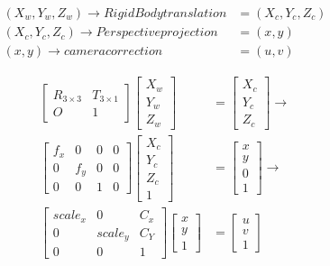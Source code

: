 \documentclass{article}
\begin{document}
\begin{align*}
    (X_w,Y_w,Z_w)\rightarrow Rigid Body translation &= (X_c,Y_c,Z_c)
    \\(X_c,Y_c,Z_c)\rightarrow Perspective projection &= (x,y)\\(x,y)\rightarrow camera correction &= (u,v)
\end{align*}

\begin{align}
    \begin{bmatrix}
        R_{3\times3} & T_{3\times1} \\O & 1
    \end{bmatrix}\begin{bmatrix}
                     X_w \\ Y_w \\ Z_w
                 \end{bmatrix} & = \begin{bmatrix}
                                       X_c \\ Y_c \\ Z_c
                                   \end{bmatrix} \rightarrow \\\begin{bmatrix}
        f_x & 0   & 0 & 0 \\
        0   & f_y & 0 & 0 \\
        0   & 0   & 1 & 0
    \end{bmatrix}\begin{bmatrix}
        X_c \\Y_c\\Z_c\\1
    \end{bmatrix}&= \begin{bmatrix}
        x \\y\\0\\1
    \end{bmatrix} \rightarrow\\
    \begin{bmatrix}
        scale_x & 0       & C_x \\
        0       & scale_y & C_Y \\
        0       & 0       & 1
    \end{bmatrix}\begin{bmatrix}
        x\\y\\1        
    \end{bmatrix} &=\begin{bmatrix}
        u\\v\\1
    \end{bmatrix}  
\end{align}
\end{document}
